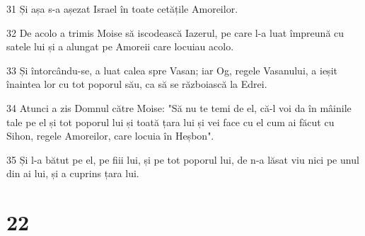 \par 31 Și așa s-a așezat Israel în toate cetățile Amoreilor.
\par 32 De acolo a trimis Moise să iscodească Iazerul, pe care l-a luat împreună cu satele lui și a alungat pe Amoreii care locuiau acolo.
\par 33 Și întorcându-se, a luat calea spre Vasan; iar Og, regele Vasanului, a ieșit înaintea lor cu tot poporul său, ca să se războiască la Edrei.
\par 34 Atunci a zis Domnul către Moise: "Să nu te temi de el, că-l voi da în mâinile tale pe el și tot poporul lui și toată țara lui și vei face cu el cum ai făcut cu Sihon, regele Amoreilor, care locuia în Heșbon".
\par 35 Și l-a bătut pe el, pe fiii lui, și pe tot poporul lui, de n-a lăsat viu nici pe unul din ai lui, și a cuprins țara lui.

\chapter{22}

